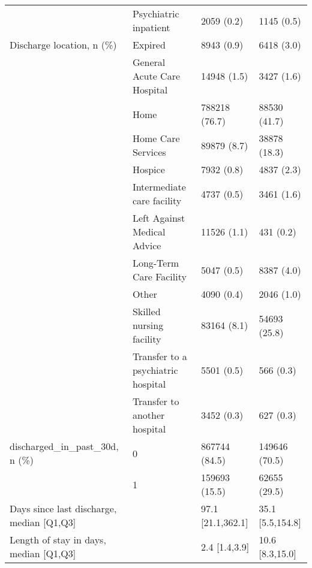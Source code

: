 \begin{tabular}{llll}
                                       & Psychiatric inpatient &                            2059 (0.2) &        1145 (0.5) \\
Discharge location, n (\%) & Expired &                            8943 (0.9) &        6418 (3.0) \\
                                       & General Acute Care Hospital &                           14948 (1.5) &        3427 (1.6) \\
                                       & Home &                         788218 (76.7) &      88530 (41.7) \\
                                       & Home Care Services &                           89879 (8.7) &      38878 (18.3) \\
                                       & Hospice &                            7932 (0.8) &        4837 (2.3) \\
                                       & Intermediate care facility &                            4737 (0.5) &        3461 (1.6) \\
                                       & Left Against Medical Advice &                           11526 (1.1) &         431 (0.2) \\
                                       & Long-Term Care Facility &                            5047 (0.5) &        8387 (4.0) \\
                                       & Other &                            4090 (0.4) &        2046 (1.0) \\
                                       & Skilled nursing facility &                           83164 (8.1) &      54693 (25.8) \\
                                       & Transfer to a psychiatric hospital &                            5501 (0.5) &         566 (0.3) \\
                                       & Transfer to another hospital &                            3452 (0.3) &         627 (0.3) \\
discharged\_in\_past\_30d, n (\%) & 0 &                         867744 (84.5) &     149646 (70.5) \\
                                       & 1 &                         159693 (15.5) &      62655 (29.5) \\
Days since last discharge, median [Q1,Q3] &   &                     97.1 [21.1,362.1] &  35.1 [5.5,154.8] \\
Length of stay in days, median [Q1,Q3] &   &                         2.4 [1.4,3.9] &   10.6 [8.3,15.0] \\
\bottomrule
\end{tabular}
